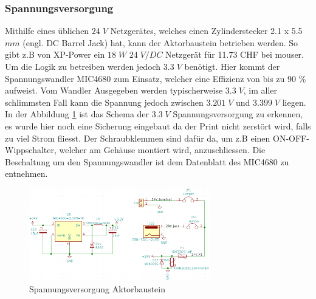 \subsubsection{Spannungsversorgung} 
Mithilfe eines üblichen $24\;V$ Netzgerätes, welches einen Zylinderstecker 2.1 x 5.5 $mm$ (engl. DC Barrel Jack) hat, kann der Aktorbaustein betrieben werden. So gibt z.B von XP-Power ein $18\;W$  $24\;V/DC$ Netzgerät für 11.73 CHF bei mouser. Um die Logik zu betreiben werden jedoch $3.3\;V$ benötigt. Hier kommt der Spannungswandler MIC4680 zum Einsatz, welcher eine Effizienz von bis zu 90 \% aufweist. Vom Wandler Ausgegeben werden typischerweise $3.3\;V$, im aller schlimmsten Fall kann die Spannung jedoch zwischen $3.201\;V$ und $3.399\;V$ liegen. In der Abbildung \ref{pic: Versorgung_aktor} ist das Schema der $3.3\;V$ Spannungsversorgung zu erkennen, es wurde hier noch eine Sicherung eingebaut da der Print nicht zerstört wird, falls zu viel Strom fliesst. Der Schraubklemmen sind dafür da, um z.B einen ON-OFF-Wippschalter, welcher am Gehäuse montiert wird, anzuschliessen. Die Beschaltung um den Spannungswandler ist dem Datenblatt des MIC4680 zu entnehmen.
\begin{figure}[h!]
	\centering
	\includegraphics[width=0.7\textwidth]{graphics/shematics_aktor_33V.png}
	\caption{Spannungsversorgung Aktorbaustein}
	\label{pic: Versorgung_aktor}
\end{figure}
\newpage
